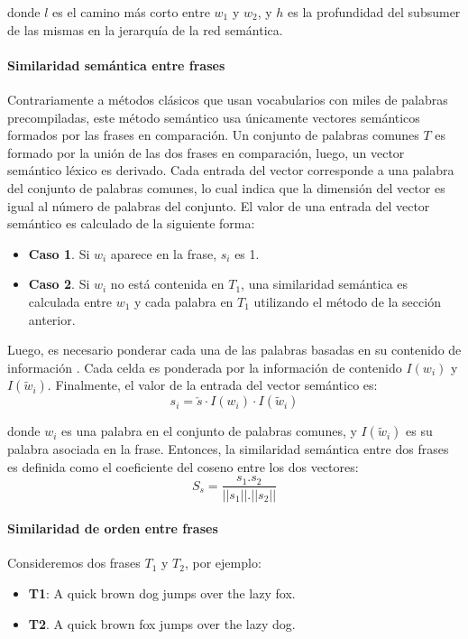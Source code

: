 donde \(l\) es el camino más corto entre \(w_1\) y \(w_2\), y \(h\) es la profundidad del subsumer de las mismas en la jerarquía de la red semántica.

\paragraph{Similaridad semántica entre frases}
Contrariamente a métodos clásicos que usan vocabularios con miles de palabras precompiladas, este método semántico usa únicamente vectores semánticos formados por las frases en comparación. Un conjunto de palabras comunes \(T\) es formado por la unión de las dos frases en comparación, luego, un vector semántico léxico es derivado. Cada entrada del vector corresponde a una palabra del conjunto de palabras comunes, lo cual indica que la dimensión del vector es igual al número de palabras del conjunto. El valor de una entrada del vector semántico es calculado de la siguiente forma:
\begin{itemize}
	\item \textbf{Caso 1}.  Si \(w_i\) aparece en la frase, \(s_i\) es 1.
	\item \textbf{Caso 2}. Si \(w_i\)  no está contenida en \(T_1\), una similaridad semántica es calculada entre \(w_1\) y cada palabra en \(T_1\) utilizando el método de la sección anterior.
\end{itemize}

Luego, es necesario ponderar cada una de las palabras basadas en su contenido de información \citep{ribadas2005semantic}. Cada celda es ponderada por la información de contenido \(I(w_i)\) y \(I(\widetilde{w}_i)\). Finalmente, el valor de la entrada del vector semántico es:
\[s_i = \check{s} \cdot I(w_i) \cdot I(\widetilde{w}_i)\]

donde \(w_i\) es una palabra en el conjunto de palabras comunes, y \(I(\widetilde{w}_i)\) es su palabra asociada en la frase. Entonces, la similaridad semántica entre dos frases es definida como el coeficiente del coseno entre los dos vectores:
\[S_s = \frac{s_1.s_2}{||s_1||.||s_2||}\]

\paragraph{Similaridad de orden entre frases}
Consideremos dos frases \(T_1\) y \(T_2\), por ejemplo:
\begin{itemize}
	\item \textbf{T1}:  A quick brown dog jumps over the lazy fox.
	\item \textbf{T2}. A quick brown fox jumps over the lazy dog.
\end{itemize}

